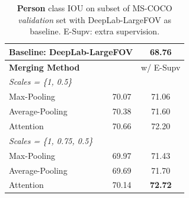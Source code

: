 \begin{table}
  \centering
  \addtolength{\tabcolsep}{2.5pt}
    \begin{tabular}{l c c}
      \toprule[0.2 em]
      \multicolumn{2}{l}{Baseline: DeepLab-LargeFOV} & 68.76 \\
      \toprule[0.2 em]
      {\bf Merging Method} & & w/ E-Supv \\
      \midrule \midrule
      {\it Scales = \{1, 0.5\}} & & \\
      Max-Pooling & 70.07 & 71.06 \\
      Average-Pooling & 70.38 & 71.60 \\
      Attention & 70.66 & 72.20 \\
      \midrule
      {\it Scales = \{1, 0.75, 0.5\}} & & \\
      Max-Pooling & 69.97 & 71.43 \\
      Average-Pooling & 69.69 & 71.70 \\
      Attention & 70.14 & {\bf 72.72} \\
      \bottomrule[0.1 em]
    \end{tabular}
    \vspace{1pt}
    \caption{{\bf Person} class IOU on subset of MS-COCO {\it validation} set with DeepLab-LargeFOV as baseline. E-Supv: extra supervision.}
    \label{tab:deeplab_coco_person}
    \vspace{-16pt}
\end{table}


